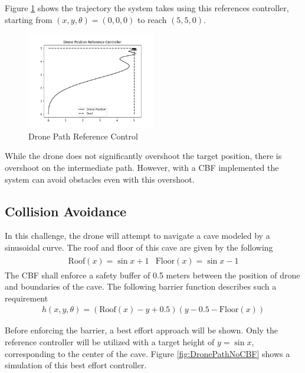 \noindent Figure \ref{fig:dronepd} shows the trajectory the system takes using this references controller, starting from $(x, y, \theta) = (0, 0, 0)$ to reach $(5, 5, 0)$.

\begin{figure}[H]
    \centering
    \includegraphics[width=0.5\textwidth]{Figures/Examples/Drone/DronePD.png}
    \caption{Drone Path Reference Control}
    \label{fig:dronepd}
\end{figure}

\noindent While the drone does not significantly overshoot the target position, there is overshoot on the intermediate path. However, with a CBF implemented the system can avoid obstacles even with this overshoot. 

\subsection{Collision Avoidance}

\noindent In this challenge, the drone will attempt to navigate a cave modeled by a sinusoidal curve. The roof and floor of this cave are given by the following 
\begin{align}
    \begin{split}
        \text{Roof}(x) = \sin{x} + 1
    \end{split}
    \begin{split}
        \text{Floor}(x) = \sin{x} - 1
    \end{split}
\end{align}
\noindent The CBF shall enforce a safety buffer of 0.5 meters between the position of drone and boundaries of the cave. The following barrier function describes such a requirement
\begin{align}
    h(x, y, \theta) = (\text{Roof}(x) - y + 0.5)(y - 0.5 - \text{Floor}(x))
\end{align}
 
 Before enforcing the barrier, a best effort approach will be shown. Only the reference controller will be utilized with a target height of $y = \sin{x}$, corresponding  to the center of the cave. Figure \ref{fig:DronePathNoCBF} shows a simulation of this best effort controller. 

